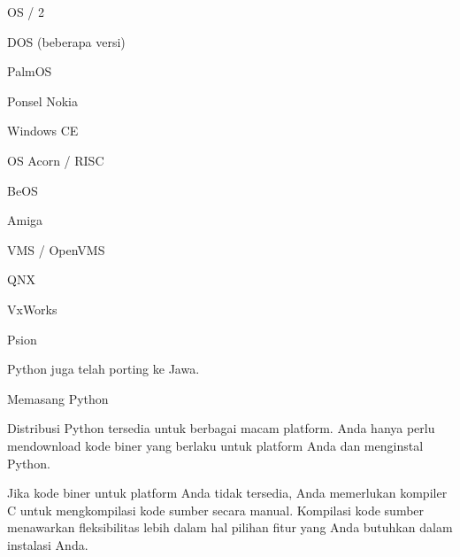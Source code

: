 \noindent 
{\fontsize{14pt}{14pt}\selectfont OS / 2 \\} \par
\noindent 
{\fontsize{14pt}{14pt}\selectfont DOS (beberapa versi) \\} \par
\noindent 
{\fontsize{14pt}{14pt}\selectfont PalmOS \\} \par
\noindent 
{\fontsize{14pt}{14pt}\selectfont Ponsel Nokia \\} \par
\noindent 
{\fontsize{14pt}{14pt}\selectfont Windows CE \\} \par
\noindent 
{\fontsize{14pt}{14pt}\selectfont OS Acorn / RISC \\} \par
\noindent 
{\fontsize{14pt}{14pt}\selectfont BeOS \\} \par
\noindent 
{\fontsize{14pt}{14pt}\selectfont Amiga \\} \par
\noindent 
{\fontsize{14pt}{14pt}\selectfont VMS / OpenVMS \\} \par
\noindent 
{\fontsize{14pt}{14pt}\selectfont QNX \\} \par
\noindent 
{\fontsize{14pt}{14pt}\selectfont VxWorks \\} \par
\noindent 
{\fontsize{14pt}{14pt}\selectfont Psion \\} \par
\noindent 
{\fontsize{14pt}{14pt}\selectfont Python juga telah porting ke Jawa. \\} \par
\noindent 
{\fontsize{14pt}{14pt}\selectfont Memasang Python \\} \par
\noindent 
{\fontsize{14pt}{14pt}\selectfont Distribusi Python tersedia untuk berbagai macam platform. Anda hanya perlu mendownload kode biner yang berlaku untuk platform Anda dan menginstal Python. \\} \par
\vspace{14pt}
\noindent 
{\fontsize{14pt}{14pt}\selectfont Jika kode biner untuk platform Anda tidak tersedia, Anda memerlukan kompiler C untuk mengkompilasi kode sumber secara manual. Kompilasi kode sumber menawarkan fleksibilitas lebih dalam hal pilihan fitur yang Anda butuhkan dalam instalasi Anda. \\} \par
